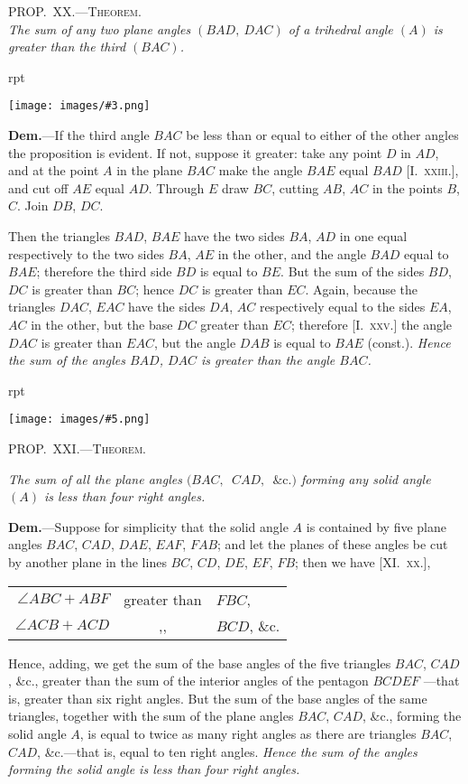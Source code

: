 \documentclass[oneside]{book}
\newcounter{wrapwidth}
\newcommand\myprop[2]{
\bigskip\Needspace*{4\baselineskip}\begin{center}\textsc{#1}\\\medskip\emph{#2}\par\end{center}
}
\newcommand\mypropflot[5]{
\vspace{0.5\baselineskip}
\bigskip\Needspace*{4\baselineskip}
\setcounter{wrapwidth}{#3}
\begin{wrapfigure}[#4]{r}{\value{wrapwidth}pt}
\begin{center}
\vspace{-0.3in}
\texttt{[image: images/\#5.png]}
\end{center}
\end{wrapfigure}
\hspace{1.5\parindent}\textsc{#1}\par\medskip
\indent\emph{#2}\par\medskip
}
\newcommand\imgflow[3]{
\setcounter{wrapwidth}{#1}
\begin{wrapfigure}[#2]{r}{\value{wrapwidth}pt}
\begin{center}
\vspace{-0.3in}
\texttt{[image: images/\#3.png]}
\end{center}
\end{wrapfigure}
}
\begin{document}
\myprop{PROP\@.~XX\@.---Theorem.}{The sum of any two plane angles $(BAD,\ DAC)$ of a
trihedral angle $(A)$ is greater than the third $(BAC)$.}

\imgflow{150}{8}{f234}

\textbf{Dem.}---If the third angle $BAC$ be less than or equal
to either of the other
angles the proposition is
evident. If not, suppose it
greater: take any point
$D$ in $AD$, and at the
point $A$ in the plane $BAC$
make the angle $BAE$
equal $BAD$ [I.~\textsc{xxiii.}],
and cut off $AE$ equal $AD$. Through $E$ draw $BC$, cutting
$AB$, $AC$ in the points $B$, $C$. Join $DB$, $DC$.

Then the triangles $BAD$, $BAE$ have the two sides
$BA$, $AD$ in one equal respectively to the two sides
$BA$, $AE$ in the other, and the angle $BAD$ equal to
$BAE$; therefore the third side $BD$ is equal to $BE$.
But the sum of the sides $BD$, $DC$ is greater than $BC$;
hence $DC$ is greater than $EC$. Again, because the
triangles $DAC$, $EAC$ have the sides $DA$, $AC$ respectively
equal to the sides $EA$, $AC$ in the other, but the
base $DC$ greater than $EC$; therefore [I.~\textsc{xxv.}] the angle
$DAC$ is greater than $EAC$, but the angle $DAB$ is equal
to $BAE$ (const.). \emph{Hence the sum of the angles $BAD$,
$DAC$  is greater than the angle $BAC$.}

\mypropflot{PROP\@.~XXI\@.---Theorem.}{The sum of all the plane angles
$(BAC,$\ $CAD,$\ $\&\mathrm{c}.)$ forming
any solid angle $(A)$ is less than four right angles.}{128}{10}{f235}

\textbf{Dem.}---Suppose for simplicity that the solid angle $A$
is contained by five plane angles $BAC$, $CAD$, $DAE$,
$EAF$, $FAB$; and let the planes of these angles be cut
by another plane in the lines $BC$, $CD$, $DE$, $EF$, $FB$;
then we have [XI\@.~\textsc{xx.}],
\begin{center}
\begin{tabular}{r@{\ }c@{\ }l}
$\angle ABC + ABF$ & greater than & $FBC$, \\[1ex]
$\angle ACB + ACD$ &      ,,      & $BCD$, \&c.
\end{tabular}
\end{center}
Hence, adding, we get the sum
of the base angles of the five
triangles $BAC$, $CAD$, \&c.,
greater than the sum of the
interior angles of the pentagon
$BCDEF$ ---that is, greater than
six right angles. But the sum
of the base angles of the same
triangles, together with the
sum of the plane angles $BAC$,
$CAD$, \&c., forming the solid
angle $A$, is equal to twice as
many right angles as there are triangles $BAC$, $CAD$,
\&c.---that is, equal to ten right angles. \emph{Hence the sum
of the angles forming the solid angle is less than four
right angles.}
\end{document}
